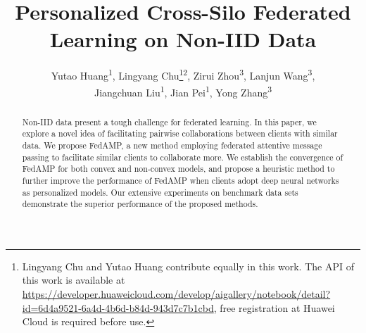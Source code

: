 \documentclass[letterpaper]{article} %
\title{Personalized Cross-Silo Federated Learning on Non-IID Data}
\author{Yutao Huang\textsuperscript{\rm 1}, Lingyang Chu\thanks{Lingyang Chu and Yutao Huang contribute equally in this work. The API of this work is available at \protect\url{https://developer.huaweicloud.com/develop/aigallery/notebook/detail?id=6d4a9521-6a4d-4b6d-b84d-943d7c7b1cbd}, free registration at Huawei Cloud is required before use.}\textsuperscript{\rm 2}, Zirui Zhou\textsuperscript{\rm 3}, Lanjun Wang\textsuperscript{\rm 3}, \\
Jiangchuan Liu\textsuperscript{\rm 1}, Jian Pei\textsuperscript{\rm 1}, Yong Zhang\textsuperscript{\rm 3}
}
\newcommand{\nop}[1]{}
\begin{document}

\maketitle

\nop{For the challenging computational environment of IOT/edge computing, personalized federated learning allows every client to train a strong personalized cloud model by effectively collaborating with the other clients in a privacy-preserving manner.}

\begin{abstract}

Non-IID data present a tough challenge for federated learning. In this paper, we explore a novel idea of facilitating pairwise collaborations between clients with similar data. We propose FedAMP, a new method employing federated attentive message passing to facilitate similar clients to collaborate more. We establish the convergence of FedAMP for both convex and non-convex models, and propose a heuristic method to further improve the performance of FedAMP when clients adopt deep neural networks as personalized models. Our extensive experiments on benchmark data sets demonstrate the superior performance of the proposed methods.

\nop{
Personalized cross-silo federated learning has raised a lot of interest from companies and institutes who want to participate as clients to collaboratively train strong personalized machine learning models without exposing their sensitive private data.
The performance of personalized cross-silo federated learning is largely determined by the effectiveness of inter-client collaboration.
However, when the data is non-IID across all clients, it is challenging to model the pair-wise collaboration relationships between clients without knowing their private data.
In this paper, we propose to tackle this problem by a novel framework named federated attentive message passing (FedAMP). 
The key idea is to realize an attentive collaboration mechanism that adaptively discovers the underlying pair-wise collaboration relationships between clients by iteratively encouraging similar clients to collaborate more with each other.
We establish the convergence of FedAMP for both convex and non-convex models, and propose a heuristic method to further improve the performance of FedAMP when clients adopt deep neural networks as personalized models. Extensive experiments demonstrate the superior performance of the proposed methods.
}
\end{abstract}










% 


%

\end{document}
